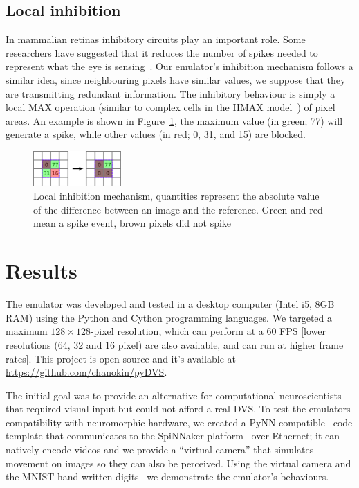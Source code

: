 \documentclass[twocolumn, a4paper]{article}
\begin{document}
\subsection{Local inhibition} 
In mammalian retinas inhibitory circuits play an important role. Some researchers have suggested that it reduces the number of spikes needed to represent what the eye is sensing~\cite{basab}. Our emulator's inhibition mechanism follows a similar idea, since neighbouring pixels have similar values, we suppose that they are transmitting redundant information. The inhibitory behaviour is simply a local MAX operation (similar to complex cells in the HMAX model~\cite{riesenhuber1999hierarchical}) of pixel areas. An example is shown in Figure~\ref{fig:local_inh}, the maximum value (in green; 77) will generate a spike, while other values (in red; 0, 31, and 15) are blocked.

\begin{figure}[htb]
\centering
    \includegraphics[width=0.3\textwidth]{inh_local_max_img}
    \caption{Local inhibition mechanism, quantities represent the absolute value of the difference between an image and the reference. Green and red mean a spike event, brown pixels did not spike}

  \label{fig:local_inh}
\end{figure}

\section{Results}
\label{sec:results}
The emulator was developed and tested in a desktop computer (Intel i5, 8GB RAM) using the Python and Cython programming languages. We targeted a maximum $128\times 128$-pixel resolution, which can perform at a 60 FPS [lower resolutions (64, 32 and 16 pixel) are also available, and can run at higher frame rates]. This project is open source and it's available at \url{https://github.com/chanokin/pyDVS}.

The initial goal was to provide an alternative for computational neuroscientists that required visual input but could not afford a real DVS. To test the emulators compatibility with neuromorphic hardware, we created a PyNN-compatible~\cite{pynn} code template that communicates to the SpiNNaker platform~\cite{spinnaker_overview} over Ethernet; it can natively encode videos and we provide a ``virtual camera'' that simulates movement on images so they can also be perceived. Using the virtual camera and the MNIST hand-written digits~\cite{mnist} we demonstrate the emulator's behaviours.
\end{document}
